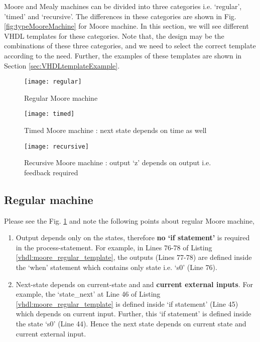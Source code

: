 Moore and Mealy machines can be divided into three categories i.e. `regular', 'timed' and `recursive'. The differences in these categories are shown in Fig. \ref{fig:typeMooreMachine} for Moore machine. In this section, we will see different VHDL templates for these categories. Note that, the design may be the combinations of these three categories, and we need to select the correct template according to the need. Further, the examples of these templates are shown in Section \ref{sec:VHDLtemplateExample}.


\begin{figure*}[!h]
	\begin{subfigure}[t]{1\textwidth}
		\centering
		\texttt{[image: regular]}
		\caption{Regular Moore machine}
		\label{subfig:regular}
	\end{subfigure} %
	\begin{subfigure}[t]{1\textwidth}
		\centering
		\texttt{[image: timed]}
		\caption{Timed Moore machine : next state depends on time as well}
		\label{subfig:timed}
	\end{subfigure}	
		
	\begin{subfigure}[t]{1\textwidth}
		\centering
		\texttt{[image: recursive]}
		\caption{Recursive Moore machine : output `z' depends on output i.e. feedback required}
		\label{subfig:recursive}
	\end{subfigure}	
	\caption{Different types of FSM}
	\label{fig:typeMooreMachine}%
\end{figure*}


\subsection{Regular machine}
Please see the Fig. \ref{subfig:regular} and note the following points about regular Moore machine, 
\begin{enumerate}
	\item Output depends only on the states, therefore \textbf{no `if statement'} is required in the process-statement. For example, in Lines 76-78 of Listing \ref{vhdl:moore_regular_template}, the outputs (Lines 77-78) are defined inside the `when' statement which contains only state i.e. `s0' (Line 76). 
	\item Next-state depends on current-state and and  \textbf{current external inputs}. For example, the `state\_next' at Line 46 of Listing \ref{vhdl:moore_regular_template} is defined inside `if statement' (Line 45) which depends on current input. Further, this `if statement' is defined inside the state `s0' (Line 44). Hence the next state depends on current state and current external input.    
\end{enumerate}

